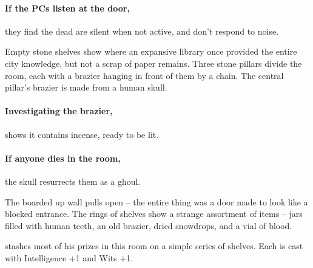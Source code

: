\begin{multicols}{2}
\paragraph{If the PCs listen at the door,}
they find the dead are silent when not active, and don't respond to noise.

\ghast

\ghoul

\label{oldlibrary}

\begin{boxtext}

  Empty stone shelves show where an expansive library once provided the entire city knowledge, but not a scrap of paper remains.
  Three stone pillars divide the room, each with a brazier hanging in front of them by a chain.
  The central pillar's brazier is made from a human skull.

\end{boxtext}

\paragraph{Investigating the brazier,}
shows it contains incense, ready to be lit.

\paragraph{If anyone dies in the room,}
the skull resurrects them as a ghoul.


\label{sewerArtefacts}

\begin{boxtext}

  The boarded up wall pulls open -- the entire thing was a door made to look like a blocked entrance.  The rings of shelves show a strange assortment of items -- jars filled with human teeth, an old brazier, dried snowdrops, and a vial of blood.

\end{boxtext}

 stashes most of his prizes in this room on a simple series of shelves.
Each is cast with Intelligence +1 and Wits +1.

\begin{enumerate}


\end{enumerate}
\end{multicols}
